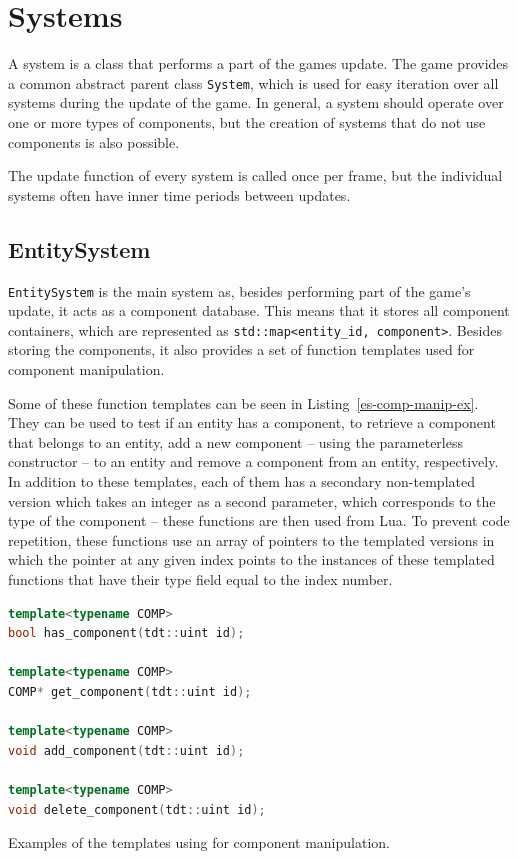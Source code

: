 \section{Systems}

A system is a class that performs a part of the games update. The game provides a common abstract parent class \texttt{System}, which is
used for easy iteration over all systems during the update of the game. In general, a system should operate over one or more types of
components, but the creation of systems that do not use components is also possible.

The update function of every system is called once per frame, but the individual systems often have inner time periods between updates.

\subsection{EntitySystem}

\texttt{EntitySystem} is the main system as, besides performing part of the game's update, it acts as a component database. This means that
it stores all component containers, which are represented as \texttt{std::map<entity\_id, component>}. Besides storing the components,
it also provides a set of function templates used for component manipulation.

Some of these function templates can be seen in Listing~\ref{es-comp-manip-ex}. They can be used to test if an entity has a component,
to retrieve a component
that belongs to an entity, add a new component -- using the parameterless constructor -- to an entity and remove a component from an entity,
respectively. In addition to these templates, each of them has a secondary non-templated version which takes an integer as a second parameter,
which corresponds to the type of the component -- these functions are then used from Lua.
To prevent code repetition, these functions use an array of pointers to the templated versions in which the pointer at any given index points
to the instances of these templated functions that have their type field equal to the index number.

\begin{listing}[h]
    \centering
    \begin{lstlisting}[language=C++]
template<typename COMP>
bool has_component(tdt::uint id);

template<typename COMP>
COMP* get_component(tdt::uint id);

template<typename COMP>
void add_component(tdt::uint id);

template<typename COMP>
void delete_component(tdt::uint id);
    \end{lstlisting}
    \caption{Examples of the templates using for component manipulation.}
    \label{es-comp-manip-ex}
\end{listing}

